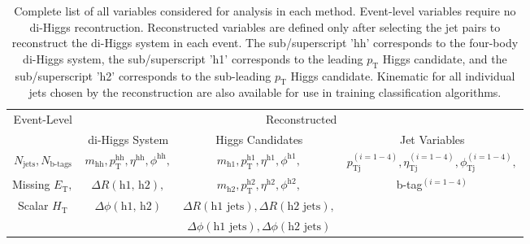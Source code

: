 \begin{table}[ht!]
 \label{tab:allVariables}
\centering
    \begin{tabular}{|c|c|c|c|} %
      \hline\hline
      \multirow{2}{*}{Event-Level} & \multicolumn{3}{c|}{Reconstructed}\\
      \cline{2-4}
      & di-Higgs System & Higgs Candidates & Jet Variables \\
      \hline
      $N_{\textrm{jets}}, N_{\textrm{b-tags}}$ & $m_{\textrm{hh}}, p_{\textrm{T}}^{\textrm{hh}}, \eta^{\textrm{hh}}, \phi^{\textrm{hh}},$ & $m_{\textrm{h1}}, p_{\textrm{T}}^{\textrm{h1}}, \eta^{\textrm{h1}}, \phi^{\textrm{h1}},$ & $p_{\textrm{Tj}}^{(i=1-4)}, \eta_{\textrm{Tj}}^{(i=1-4)}, \phi_{\textrm{Tj}}^{(i=1-4)},$ \\
      Missing $E_{\textrm{T}},$ & $\Delta R(\textrm{h1, h2}),$& $m_{\textrm{h2}}, p_{\textrm{T}}^{\textrm{h2}}, \eta^{\textrm{h2}}, \phi^{\textrm{h2}},$ & b-tag$^{(i=1-4)}$\\
      Scalar $H_{\textrm{T}}$ & $\Delta \phi(\textrm{h1, h2})$& $\Delta R(\textrm{h1 jets}), \Delta R(\textrm{h2 jets}),$& \\
      & & $\Delta \phi(\textrm{h1 jets}), \Delta \phi(\textrm{h2 jets})$ & \\
      \hline\hline
    \end{tabular}
\caption{Complete list of all variables considered for analysis in each method. Event-level variables require no di-Higgs recontruction. Reconstructed variables are defined only after selecting the jet pairs to reconstruct the di-Higgs system in each event. The sub/superscript 'hh' corresponds to the four-body di-Higgs system, the sub/superscript 'h1' corresponds to the leading $p_{\textrm{T}}$ Higgs candidate, and the sub/superscript 'h2' corresponds to the sub-leading $p_{\textrm{T}}$ Higgs candidate. Kinematic for all individual jets chosen by the reconstruction are also available for use in training classification algorithms.}
\end{table}
